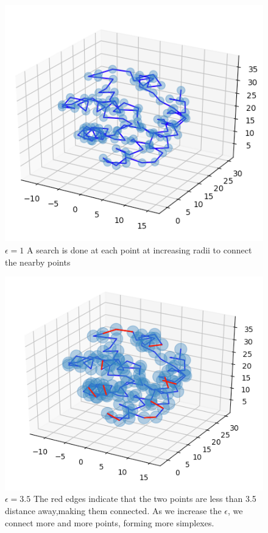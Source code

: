 \documentclass[12pt, a4paper, twocolumn, fullpage]{article}
\theoremstyle{plain}
\theoremstyle{definition}
\theoremstyle{remark}
\begin{document}
\begin{figure}[H]
    \includegraphics[width=\linewidth]{img/hom/ballRad1.png}
    \caption{$\epsilon = 1$ A search is done at each point at increasing radii to connect the nearby points }
    \label{ballRad1}
\end{figure}


\begin{figure}[H]
    \includegraphics[width=\linewidth]{img/hom/ballRad2.png}
    \caption{$\epsilon = 3.5$ The red edges indicate that the two points are less than 3.5 distance away,making them connected. As we increase the $\epsilon$, we connect more and more points, forming more simplexes.}
    \label{ballRad2}
\end{figure}
\end{document}
